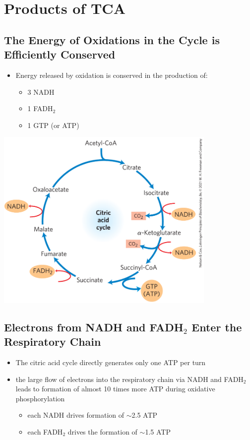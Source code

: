 \documentclass[10pt]{article}
\begin{document}
\section*{Products of TCA}
\subsection*{The Energy of Oxidations in the Cycle is Efficiently Conserved}
\begin{itemize}
	\item Energy released by oxidation is conserved in the production of:
	\begin{itemize}
        \item 3 NADH
        \item 1 FADH$_2$
        \item 1 GTP (or ATP)
    \end{itemize}
\end{itemize}
\begin{center} 
    \includegraphics*[width=0.8\textwidth]{L4_21.png} 
\end{center}

\subsection*{Electrons from NADH and FADH$_2$ Enter the Respiratory Chain}
\begin{itemize}
	\item The citric acid cycle directly generates only one ATP per turn
	\item the large flow of electrons into the respiratory chain via NADH and FADH$_2$ leads to formation of almost 10 times more ATP during oxidative phosphorylation
	\begin{itemize}
        \item each NADH drives formation of $\sim$2.5 ATP
        \item each FADH$_2$ drives the formation of $\sim$1.5 ATP
    \end{itemize}
\end{itemize}
\end{document}

